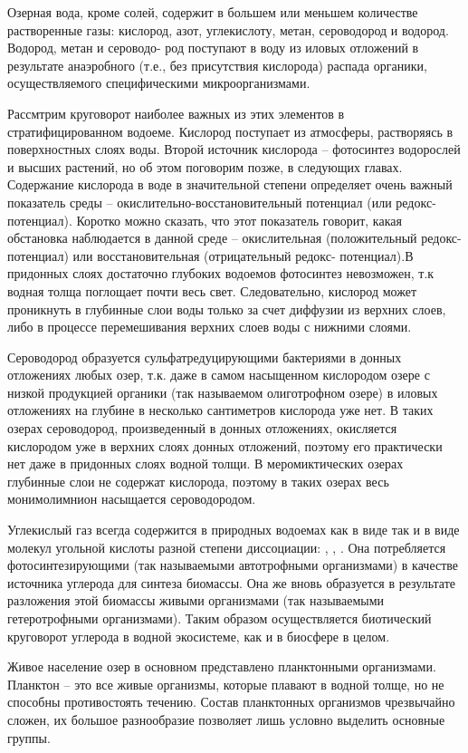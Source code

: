 Озерная вода, кроме солей, содержит в большем или меньшем количестве растворенные
газы: кислород, азот, углекислоту, метан, сероводород и водород. Водород, метан и сероводо-
род поступают в воду из иловых отложений в результате анаэробного (т.е., без присутствия
кислорода) распада органики, осуществляемого специфическими микроорганизмами.

Рассмтрим круговорот наиболее важных из этих элементов в стратифицированном водоеме. Кислород поступает из атмосферы, растворяясь в поверхностных слоях воды. Второй
источник кислорода – фотосинтез водорослей и высших растений, но об этом поговорим
позже, в следующих главах. Содержание кислорода в воде в значительной степени определяет очень важный показатель среды – окислительно-восстановительный потенциал (или
редокс-потенциал). Коротко можно сказать, что этот показатель говорит, какая обстановка
наблюдается в данной среде – окислительная (положительный редокс-потенциал) или восстановительная (отрицательный редокс- потенциал).В придонных слоях достаточно глубоких
водоемов фотосинтез невозможен, т.к водная толща поглощает почти весь свет. Следовательно, кислород может проникнуть в глубинные слои воды только за счет диффузии из верхних
слоев, либо в процессе перемешивания верхних слоев воды с нижними слоями.

Сероводород образуется сульфатредуцирующими бактериями в донных отложениях любых озер, т.к. даже в самом насыщенном кислородом озере с низкой продукцией органики
(так называемом олиготрофном озере) в иловых отложениях на глубине в несколько сантиметров кислорода уже нет. В таких озерах сероводород, произведенный в донных отложениях, окисляется кислородом уже в верхних слоях донных отложений, поэтому его практически
нет даже в придонных слоях водной толщи. В меромиктических озерах глубинные слои не
содержат кислорода, поэтому в таких озерах весь монимолимнион насыщается сероводородом.

Углекислый газ всегда содержится в природных водоемах как в виде 
так и в виде
молекул угольной кислоты разной степени диссоциации: ,  ,  .
 Она потребляется фотосинтезирующими (так называемыми автотрофными организмами) в качестве
источника углерода для синтеза биомассы. Она же вновь образуется в результате разложения этой биомассы живыми организмами (так называемыми гетеротрофными организмами).
Таким образом осуществляется биотический круговорот углерода в водной экосистеме, как
и в биосфере в целом.

Живое население озер в основном представлено планктонными организмами. Планктон –
это все живые организмы, которые плавают в водной толще, но не способны противостоять
течению. Состав планктонных организмов чрезвычайно сложен, их большое разнообразие
позволяет лишь условно выделить основные группы.


